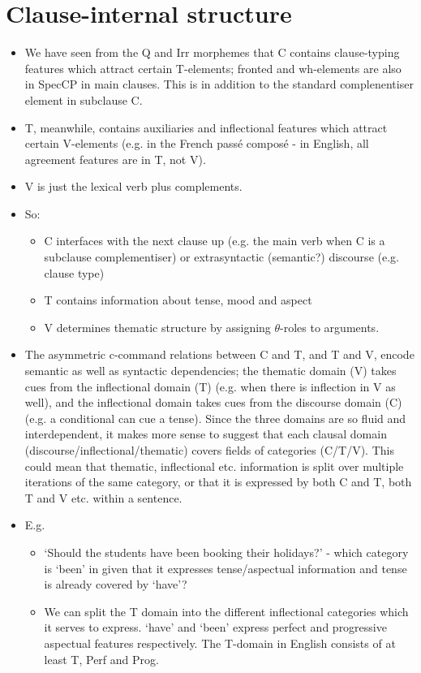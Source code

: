 \documentclass{article}
\begin{document}
\section{Clause-internal structure}
\begin{itemize}
    \item We have seen from the Q and Irr morphemes that C contains clause-typing features which attract certain T-elements; fronted and wh-elements are also in SpecCP in main clauses. This is in addition to the standard complenentiser element in subclause C.
    \item T, meanwhile, contains auxiliaries and inflectional features which attract certain V-elements (e.g. in the French passé composé - in English, all agreement features are in T, not V).
    \item V is just the lexical verb plus complements.
    \item So:
    \begin{itemize}
        \item C interfaces with the next clause up (e.g. the main verb when C is a subclause complementiser) or extrasyntactic (semantic?) discourse (e.g. clause type)
        \item T contains information about tense, mood and aspect
        \item V determines thematic structure by assigning $\theta$-roles to arguments.
    \end{itemize}
\item The asymmetric c-command relations between C and T, and T and V, encode semantic as well as syntactic dependencies; the thematic domain (V) takes cues from the inflectional domain (T) (e.g. when there is inflection in V as well), and the inflectional domain takes cues from the discourse domain (C) (e.g. a conditional can cue a tense). Since the three domains are so fluid and interdependent, it makes more sense to suggest that each clausal domain (discourse/inflectional/thematic) covers fields of categories (C/T/V). This could mean that thematic, inflectional etc. information is split over multiple iterations of the same category, or that it is expressed by both C and T, both T and V etc. within a sentence.
\item E.g.
\begin{itemize}
    \item `Should the students have been booking their holidays?' - which category is `been' in given that it expresses tense/aspectual information and tense is already covered by `have'? 
    \item We can split the T domain into the different inflectional categories which it serves to express. `have' and `been' express perfect and progressive aspectual features respectively. The T-domain in English consists of at least T, Perf and Prog.

\end{itemize}
\end{itemize}
\end{document}
